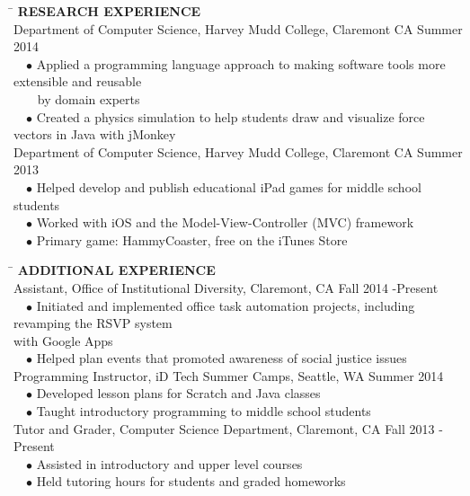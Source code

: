 \documentclass[11pt]{article}
\newcommand{\sectionNL}{\\[-2pt]}
\newcommand{\customtab}{$\hspace{10pt} \bullet \hspace{2pt}$}
\newcommand{\customtabinline}{$\hspace{23pt}$}
\begin{document}
\begin{tabbing} 
\hspace*{6.5in}\= \kill
{\textbf{RESEARCH EXPERIENCE} } \> \sectionNL
Department of Computer Science, Harvey Mudd College, Claremont CA \>Summer 2014 \\
\customtab Applied a programming language approach to making software tools more extensible and reusable \\ \customtabinline by domain experts \\
\customtab Created a physics simulation to help students draw and visualize force vectors in Java with jMonkey\\

Department of Computer Science, Harvey Mudd College, Claremont CA \>Summer 2013 \\
\customtab Helped develop and publish educational iPad games for middle school students \\
\customtab Worked with iOS and the Model-View-Controller (MVC) framework \\
\customtab Primary game: HammyCoaster, free on the iTunes Store
\end{tabbing}


\begin{tabbing} 
\hspace*{6.5in}\= \kill
{\textbf{ADDITIONAL EXPERIENCE } } \> \sectionNL
Assistant, Office of Institutional Diversity, Claremont, CA \>Fall 2014 -Present \\
\customtab Initiated and implemented office task automation projects, including revamping the RSVP system \\ with Google Apps \\
\customtab Helped plan events that promoted awareness of social justice issues \\

Programming Instructor, iD Tech Summer Camps, Seattle, WA \> Summer 2014 \\
\customtab Developed lesson plans for Scratch and Java classes \\
\customtab Taught introductory programming to  middle school students\\

Tutor and Grader, Computer Science Department, Claremont, CA \> Fall 2013 -Present \\ %
\customtab Assisted in introductory and upper level courses \\
\customtab Held tutoring hours for students and graded homeworks
\end{tabbing}
\end{document}
